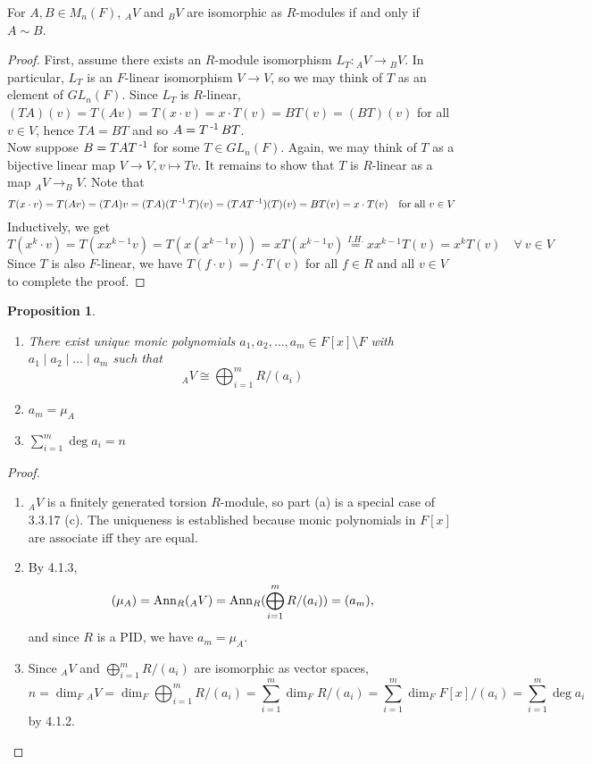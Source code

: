 \documentclass[11pt]{book}
\newcounter{counter}
\newtheorem{proposition}[counter]{Proposition}   \newtheorem{problem}[counter]{Problem}   \newtheorem*{proposition*}{Proposition}   \newtheorem*{lemma*}{Lemma}
\theoremstyle{definition}   \newtheorem{defn}[counter]{Definition} %
\newcommand{\bs}{\setminus}   \newcommand{\A}{\mathcal{A}}   \newcommand{\sy}{\textnormal{Syl}}   \newcommand{\size}[1]{\left| #1 \right|}
\newcommand{\ann}[2]{\textnormal{Ann}_{#1}(#2)}   \newcommand{\rk}{\textnormal{rk}}
\DeclareMathOperator{\ra}{\rightarrow}   \DeclareMathOperator{\Poly}{\mathbf{P}}   \DeclareMathOperator{\spn}{\textnormal{span}}   \DeclareMathOperator{\aut}{\textnormal{Aut}}
\newcommand{\vs}{\vspace{8pt}}   \newcommand{\hs}{\hspace{8pt}}
\numberwithin{counter}{chapter}
\begin{document}
\vs

\begin{lemma}
For $A,B \in M_n(F)$, $_AV$ and $_BV$ are isomorphic as $R$-modules if and only if $A \sim B$.
\end{lemma}

\begin{proof}
First, assume there exists an $R$-module isomorphism $L_T : {_AV} \ra {_BV}$. In particular, $L_T$ is an $F$-linear isomorphism $V \ra V$, so we may think of $T$ as an element of $GL_n(F)$. Since $L_T$ is $R$-linear, \\ $(TA)(v) = T(Av) = T(x \cdot v) = x \cdot T(v) = B T(v) = (BT)(v)$ for all $v \in V$, hence $TA = BT$ and so $A = T\operatorname{^{-1}} BT$. \\

Now suppose $B = TAT\operatorname{^{-1}}$ for some $T \in GL_n(F)$. Again, we may think of $T$ as a bijective linear map $V \ra V, v \mapsto Tv$. It remains to show that $T$ is $R$-linear as a map $_AV \ra _BV$. Note that
	\[T(x \cdot v) = T(Av) = (TA)v = (TA)(T\operatorname{^{-1}} T)(v) = (TAT\operatorname{^{-1}})(T)(v) = BT(v) = x \cdot T(v) \quad \textnormal{for all } v \in V \]
Inductively, we get
	\[T(x^k \cdot v) = T(x x^{k-1}v) = T(x (x^{k-1}v)) = xT(x^{k-1}v) \overset{I. H.}{=} xx^{k-1}T(v) = x^k T(v)  \quad \forall \ v \in V \]
Since $T$ is also $F$-linear, we have $T(f \cdot v) = f \cdot T(v)$ for all $f \in R$ and all $v \in V$ to complete the proof.
\end{proof}

\newpage

\begin{proposition}\
\begin{enumerate}
\item[(a)] There exist unique monic polynomials $a_1,a_2,\dots,a_m \in F[x]\bs F$ with $a_1 \mid a_2 \mid \dots \mid a_m$ such that
	\[_AV \cong \bigoplus_{i=1}^m R/(a_i) \]
\item[(b)] $a_m = \mu_A$
\item[(c)] $\sum_{i=1}^m \deg a_i = n$
\end{enumerate}
\end{proposition}

\begin{proof}\
\begin{enumerate}
\item[(a)] $_AV$ is a finitely generated torsion $R$-module, so part (a) is a special case of 3.3.17 (c). The uniqueness is established because monic polynomials in $F[x]$ are associate iff they are equal.
\item[(b)] By 4.1.3, $$(\mu_A) = \ann{R}{_AV} = \ann{R}{\bigoplus_{i=1}^m R/(a_i)} = (a_m),$$ and since $R$ is a PID, we have $a_m = \mu_A$.
\item[(c)] Since $_AV$ and $\bigoplus_{i=1}^m R/(a_i)$ are isomorphic as vector spaces,
	\[n = \dim_F {_AV} = \dim_F \bigoplus_{i=1}^m R/(a_i) = \sum_{i=1}^m \dim_F R/(a_i) = \sum_{i=1}^m \dim_F F[x]/(a_i) = \sum_{i=1}^m \deg a_i \]
by 4.1.2.
\end{enumerate}
\end{proof}
\end{document}
